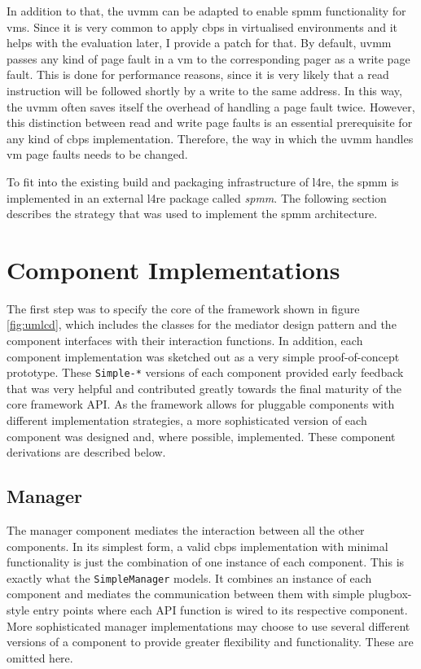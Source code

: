 In addition to that, the \acf{uvmm} can be adapted to enable \ac{spmm} functionality for \acp{vm}.
Since it is very common to apply \ac{cbps} in virtualised environments and it helps with the evaluation later, I provide a patch for that.
By default, \ac{uvmm} passes any kind of page fault in a \ac{vm} to the corresponding pager as a write page fault.
This is done for performance reasons, since it is very likely that a read instruction will be followed shortly by a write to the same address.
In this way, the \ac{uvmm} often saves itself the overhead of handling a page fault twice.
However, this distinction between read and write page faults is an essential prerequisite for any kind of \ac{cbps} implementation.
Therefore, the way in which the \ac{uvmm} handles \ac{vm} page faults needs to be changed.

To fit into the existing build and packaging infrastructure of \ac{l4re}, the \ac{spmm} is implemented in an external \ac{l4re} package called \emph{spmm}.
The following section describes the strategy that was used to implement the \ac{spmm} architecture.

\section{Component Implementations}
\label{sec:component-implementations}

The first step was to specify the core of the framework shown in figure \ref{fig:umlcd}, which includes the classes for the mediator design pattern and the component interfaces with their interaction functions.
In addition, each component implementation was sketched out as a very simple proof-of-concept prototype.
These \texttt{Simple-*} versions of each component provided early feedback that was very helpful and contributed greatly towards the final maturity of the core framework API.
As the framework allows for pluggable components with different implementation strategies, a more sophisticated version of each component was designed and, where possible, implemented.
These component derivations are described below.

\subsection*{Manager}
\label{subsec:manager}

The manager component mediates the interaction between all the other components.
In its simplest form, a valid \ac{cbps} implementation with minimal functionality is just the combination of one instance of each component.
This is exactly what the \texttt{SimpleManager} models.
It combines an instance of each component and mediates the communication between them with simple plugbox-style entry points where each API function is wired to its respective component.
More sophisticated manager implementations may choose to use several different versions of a component to provide greater flexibility and functionality.
These are omitted here.

